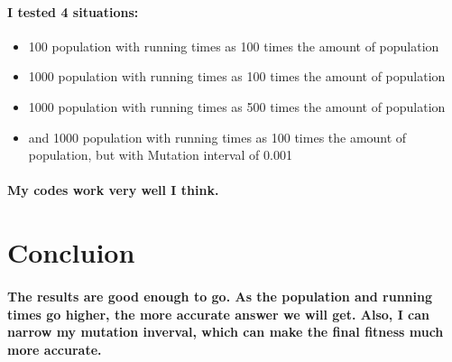 \documentclass[12pt]{article}
\begin{document}
\paragraph{I tested 4 situations:}
\begin{itemize}
	\item 100 population with running times as 100 times the amount of population
	\item 1000 population with running times as 100 times the amount of population
	\item 1000 population with running times as 500 times the amount of population
	\item and 1000 population with running times as 100 times the amount of population, but with Mutation interval of 0.001
\end{itemize}
\paragraph{My codes work very well I think.}

\section{Concluion}
\paragraph{The results are good enough to go. As the population and running times go higher, the more accurate answer we will get. Also, I can narrow my mutation inverval, which can make the final fitness much more accurate.}
\end{document}
